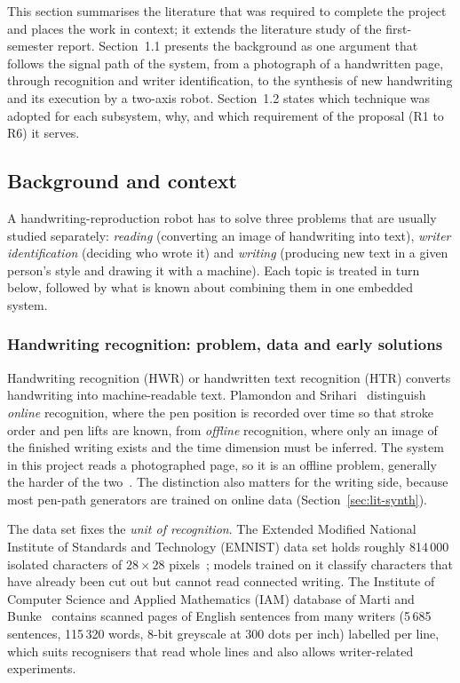 \label{sec:literature}
This section summarises the literature that was required to complete the project and places the work in context; it extends the literature study of the first-semester report. Section~1.1 presents the background as one argument that follows the signal path of the system, from a photograph of a handwritten page, through recognition and writer identification, to the synthesis of new handwriting and its execution by a two-axis robot. Section~1.2 states which technique was adopted for each subsystem, why, and which requirement of the proposal (R1 to R6) it serves.

\subsection{Background and context}
\label{sec:lit-background}

A handwriting-reproduction robot has to solve three problems that are usually studied separately: \emph{reading} (converting an image of handwriting into text), \emph{writer identification} (deciding who wrote it) and \emph{writing} (producing new text in a given person's style and drawing it with a machine). Each topic is treated in turn below, followed by what is known about combining them in one embedded system.

\subsubsection{Handwriting recognition: problem, data and early solutions}
\label{sec:lit-hwr}

Handwriting recognition (HWR) or handwritten text recognition (HTR) converts handwriting into machine-readable text. Plamondon and Srihari~\cite{plamondon2000} distinguish \emph{online} recognition, where the pen position is recorded over time so that stroke order and pen lifts are known, from \emph{offline} recognition, where only an image of the finished writing exists and the time dimension must be inferred. The system in this project reads a photographed page, so it is an offline problem, generally the harder of the two~\cite{plamondon2000}. The distinction also matters for the writing side, because most pen-path generators are trained on online data (Section~\ref{sec:lit-synth}).

The data set fixes the \emph{unit of recognition}. The Extended Modified National Institute of Standards and Technology (EMNIST) data set holds roughly 814\,000 isolated characters of $28\times28$ pixels~\cite{chen2023}; models trained on it classify characters that have already been cut out but cannot read connected writing. The Institute of Computer Science and Applied Mathematics (IAM) database of Marti and Bunke~\cite{marti2002} contains scanned pages of English sentences from many writers (5\,685 sentences, 115\,320 words, 8-bit greyscale at 300 dots per inch) labelled per line, which suits recognisers that read whole lines and also allows writer-related experiments.


